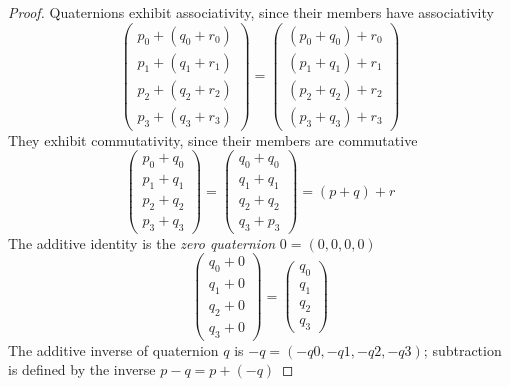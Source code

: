 \documentclass{amsart}
\theoremstyle{definition}
\theoremstyle{remark}
\numberwithin{equation}{section}
\begin{document}
\begin{proof}
  Quaternions exhibit associativity, since their members have associativity
  \begin{equation}
    \begin{pmatrix}
      p_0 + (q_0 + r_0) \\
      p_1 + (q_1 + r_1) \\
      p_2 + (q_2 + r_2) \\
      p_3 + (q_3 + r_3)
    \end{pmatrix} =
    \begin{pmatrix}
      (p_0 + q_0) + r_0 \\
      (p_1 + q_1) + r_1 \\
      (p_2 + q_2) + r_2 \\
      (p_3 + q_3) + r_3
    \end{pmatrix}
  \end{equation}
  They exhibit commutativity, since their members are commutative
  \begin{equation}
    \begin{pmatrix}
      p_0 + q_0 \\
      p_1 + q_1 \\
      p_2 + q_2 \\
      p_3 + q_3
    \end{pmatrix} =
    \begin{pmatrix}
      q_0 + q_0 \\
      q_1 + q_1 \\
      q_2 + q_2 \\
      q_3 + p_3
    \end{pmatrix} = (p + q) + r
  \end{equation}
  The additive identity is the \emph{zero quaternion} $0=(0, 0, 0, 0)$
  \begin{equation}
    \begin{pmatrix}
      q_0 + 0 \\
      q_1 + 0 \\
      q_2 + 0 \\
      q_3 + 0
    \end{pmatrix} =
    \begin{pmatrix}
      q_0 \\
      q_1 \\
      q_2 \\
      q_3
    \end{pmatrix}
  \end{equation}
  The additive inverse of quaternion $q$ is $-q=(-q0, -q1, -q2, -q3)$; subtraction is defined by the inverse $p-q = p+ (-q)$

\end{proof}
\end{document}
